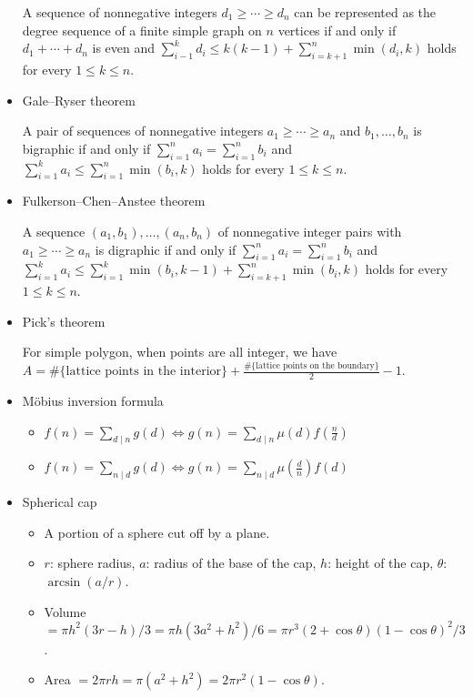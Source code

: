 \begin{itemize}
A sequence of nonnegative integers $d_1\ge\cdots\ge d_n$ can be represented as the degree sequence of a finite simple graph on $n$ vertices if and only if $d_1+\cdots+d_n$ is even and $\displaystyle\sum_{i-1}^kd_i\le k(k-1)+\displaystyle\sum_{i=k+1}^n\min(d_i,k)$ holds for every $1\le k\le n$.

\item Gale–Ryser theorem

A pair of sequences of nonnegative integers $a_1\ge\cdots\ge a_n$ and $b_1,\ldots,b_n$ is bigraphic if and only if $\displaystyle\sum_{i=1}^n a_i=\displaystyle\sum_{i=1}^n b_i$ and $\displaystyle\sum_{i=1}^k a_i\le \displaystyle\sum_{i=1}^n\min(b_i,k)$ holds for every $1\le k\le n$.

\item Fulkerson–Chen–Anstee theorem

A sequence $(a_1,b_1),\ldots,(a_n,b_n)$ of nonnegative integer pairs with $a_1\ge\cdots\ge a_n$ is digraphic if and only if $\displaystyle\sum_{i=1}^n a_i=\displaystyle\sum_{i=1}^n b_i$ and $\displaystyle\sum_{i=1}^k a_i\le \displaystyle\sum_{i=1}^k\min(b_i,k-1)+\displaystyle\sum_{i=k+1}^n\min(b_i,k)$ holds for every $1\le k\le n$.

\item Pick's theorem

For simple polygon, when points are all integer, we have $A=\text{\#\{lattice points in the interior\}} + \frac{\text{\#\{lattice points on the boundary\}}}{2} - 1$.

\item Möbius inversion formula

\begin{itemize}
  \item $f(n)=\sum_{d\mid n}g(d)\Leftrightarrow g(n)=\sum_{d\mid n}\mu(d)f(\frac{n}{d})$
  \item $f(n)=\sum_{n\mid d}g(d)\Leftrightarrow g(n)=\sum_{n\mid d}\mu(\frac{d}{n})f(d)$
\end{itemize}

\item Spherical cap

\begin{itemize}
  \item A portion of a sphere cut off by a plane.
  \item $r$: sphere radius, $a$: radius of the base of the cap, $h$: height of the cap, $\theta$: $\arcsin(a/r)$.
  \item Volume $=\pi h^2(3r-h)/3=\pi h(3a^2+h^2)/6=\pi r^3(2+\cos\theta)(1-\cos\theta)^2/3$.
  \item Area $=2\pi rh=\pi(a^2+h^2)=2\pi r^2(1-\cos\theta)$.
\end{itemize}


\end{itemize}
